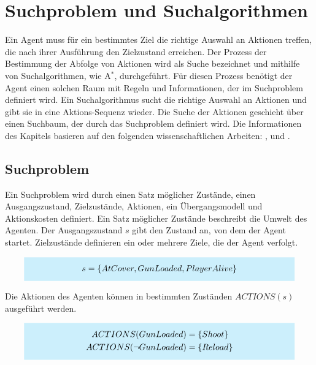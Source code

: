 \newcommand{\highlightbox}[2]{%
    \colorbox{cyan!20}{%
        \parbox{#1}{\vspace{0.5em}\centering #2\vspace{0.5em}}%
    }%
}


\chapter{Suchproblem und Suchalgorithmen}

Ein Agent muss für ein bestimmtes Ziel die richtige Auswahl an Aktionen treffen, die nach ihrer Ausführung den Zielzustand erreichen. Der Prozess der Bestimmung der Abfolge von Aktionen wird als Suche bezeichnet und mithilfe von Suchalgorithmen, wie A$^*$, durchgeführt. Für diesen Prozess benötigt der Agent einen solchen Raum mit Regeln und Informationen, der im Suchproblem definiert wird. Ein Suchalgorithmus sucht die richtige Auswahl an Aktionen und gibt sie in eine Aktions-Sequenz wieder. Die Suche der Aktionen geschieht über einen Suchbaum, der durch das Suchproblem definiert wird. Die Informationen des Kapitels basieren auf den folgenden wissenschaftlichen Arbeiten: \autocite{RN2020}, \autocite{4082128} und \autocite{Felner2011}.

\section{Suchproblem}

Ein Suchproblem wird durch einen Satz möglicher Zustände, einen Ausgangszustand, Zielzustände, Aktionen, ein Übergangsmodell und Aktionskosten definiert. Ein Satz möglicher Zustände beschreibt die Umwelt des Agenten. Der Ausgangszustand $s$ gibt den Zustand an, von dem der Agent startet. Zielzustände definieren ein oder mehrere Ziele, die der Agent verfolgt.

\[
\highlightbox{0.9\textwidth}{$
    \begin{aligned}
			s = \{AtCover, GunLoaded, PlayerAlive\}
    \end{aligned}
$}
\]

Die Aktionen des Agenten können in bestimmten Zuständen $ACTIONS(s)$ ausgeführt werden.

\[
\highlightbox{0.9\textwidth}{$
    \begin{aligned}
			ACTIONS(GunLoaded) &= \{Shoot\} \\
			ACTIONS(\lnot GunLoaded) &= \{Reload\}
    \end{aligned}
$}
\]

